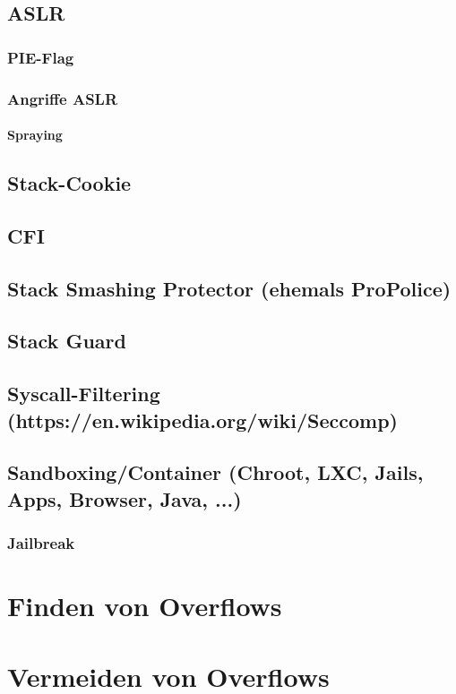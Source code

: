 ﻿\documentclass[12pt]{book}
\begin{document}
\subsection{ASLR}

\subsubsection{PIE-Flag}

\subsubsection{Angriffe ASLR}

\paragraph{Spraying}

\subsection{Stack-Cookie}

\subsection{CFI}

\subsection{Stack Smashing Protector (ehemals ProPolice)}

\subsection{Stack Guard}

\subsection{Syscall-Filtering (https://en.wikipedia.org/wiki/Seccomp)}

\subsection{Sandboxing/Container (Chroot, LXC, Jails, Apps, Browser, Java, ...)}

\subsubsection{Jailbreak}

\section{Finden von Overflows}

\section{Vermeiden von Overflows}
\end{document}
